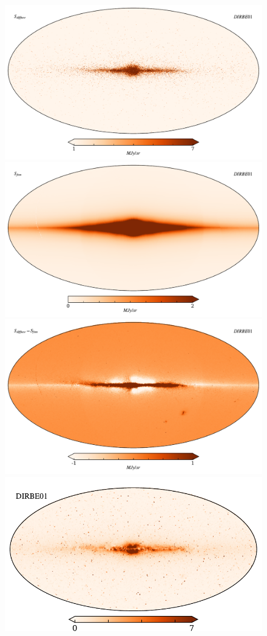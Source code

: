 \documentclass{aa}
\begin{document}
\begin{figure}
\includegraphics[width=0.9\columnwidth]{figs/diffuseTemplate/diffuse_stars.pdf}  \vspace{-4pt}\\
  \includegraphics[width=0.9\columnwidth]{figs/diffuseTemplate/dirbe_template.pdf}\\
  \includegraphics[width=0.9\columnwidth]{figs/diffuseTemplate/diffuse_diff.pdf}\\
  \includegraphics[width=0.9\columnwidth]{figs/diffuseTemplate/band_01_map.pdf}\\

\end{figure}
\end{document}
